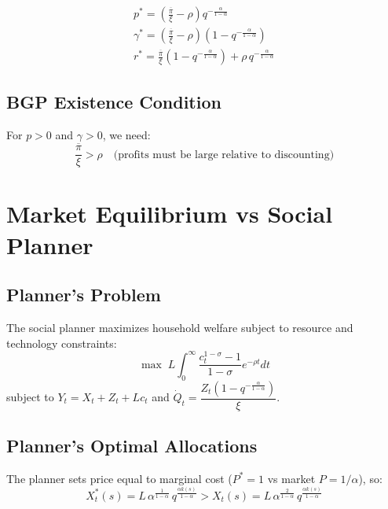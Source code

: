 \documentclass[a4paper,11pt]{article}
\newcommand{\pibar}{\overline{\pi}}
\begin{document}
\begin{resultbox}
\begin{align*}
\boxed{p^* = \left(\frac{\pibar}{\xi} - \rho\right) q^{-\frac{\alpha}{1-\alpha}}}
\tag{Eqm Innovation Rate}\\[0.5em]
\boxed{\gamma^* = \left(\frac{\pibar}{\xi} - \rho\right)\!\left(1 - q^{-\frac{\alpha}{1-\alpha}}\right)}
\tag{BGP Growth}\\[0.5em]
\boxed{r^* = \frac{\pibar}{\xi}\!\left(1 - q^{-\frac{\alpha}{1-\alpha}}\right) + \rho\, q^{-\frac{\alpha}{1-\alpha}}}
\tag{Eqm Interest Rate}
\end{align*}
\end{resultbox}

\subsection*{BGP Existence Condition}

For $p > 0$ and $\gamma > 0$, we need:
\[
\frac{\pibar}{\xi} > \rho \quad \text{(profits must be large relative to discounting)}
\]

\clearpage

\section{Market Equilibrium vs Social Planner}

\subsection*{Planner's Problem}

The social planner maximizes household welfare subject to resource and technology constraints:
\[
\max \; L\int_0^\infty \frac{c_t^{1-\sigma}-1}{1-\sigma} e^{-\rho t} dt
\]
subject to $Y_t = X_t + Z_t + Lc_t$ and $\dot{Q}_t = \dfrac{Z_t(1-q^{-\frac{\alpha}{1-\alpha}})}{\xi}$.

\subsection*{Planner's Optimal Allocations}

The planner sets price equal to marginal cost ($P^* = 1$ vs market $P = 1/\alpha$), so:
\[
X_t^*(s) = L\,\alpha^{\frac{1}{1-\alpha}}\, q^{\frac{\alpha k(s)}{1-\alpha}} > X_t(s) = L\,\alpha^{\frac{2}{1-\alpha}}\, q^{\frac{\alpha k(s)}{1-\alpha}}
\]
\end{document}
